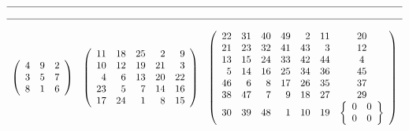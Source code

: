$$\begin{array}{lll}\hline \\ \hline \\
\left(\begin{array}{rrr}
4 & 9 & 2 \\
3 & 5 & 7 \\
8 & 1 & 6
\end{array} \right) &
\left(\begin{array}{rrrrr}
11 & 18 & 25 &  2 & 9 \\
10 & 12 & 19 & 21 & 3 \\
 4 &  6 & 13 & 20 & 22 \\
23 &  5 &  7 & 14 & 16 \\
17 & 24 &  1 &  8 & 15
\end{array} \right) &
\left(\begin{array}{rrrrrrc}
22 & 31 & 40 & 49 &  2 & 11 & 20 \\
21 & 23 & 32 & 41 & 43 &  3 & 12 \\
13 & 15 & 24 & 33 & 42 & 44 &  4 \\
 5 & 14 & 16 & 25 & 34 & 36 & 45 \\
46 &  6 &  8 & 17 & 26 & 35 & 37 \\
38 & 47 &  7 &  9 & 18 & 27 & 29 \\
30 & 39 & 48 &  1 & 10 & 19 &
\left\{\begin{array}{ll} 0 & 0 \\ 0 & 0 \end{array}\right\}
\end{array} \right) 
\end{array} $$

